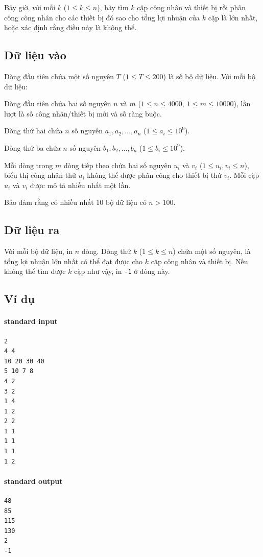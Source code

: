 \documentclass[11pt]{article}
\begin{document}
Bây giờ, với mỗi \(k\) (\(1\le k\le n\)), hãy tìm \(k\) cặp công nhân và
thiết bị rồi phân công công nhân cho các thiết bị đó sao cho tổng lợi nhuận
của \(k\) cặp là lớn nhất, hoặc xác định rằng điều này là không thể.

\subsection*{Dữ liệu vào}

Dòng đầu tiên chứa một số nguyên \(T\) (\(1\le T\le 200\)) là số bộ dữ liệu.
Với mỗi bộ dữ liệu:

Dòng đầu tiên chứa hai số nguyên \(n\) và \(m\)
(\(1\le n\le 4000,\ 1\le m\le 10000\)), lần lượt là số công nhân/thiết bị mới
và số ràng buộc.

Dòng thứ hai chứa \(n\) số nguyên \(a_1,a_2,\ldots,a_n\)
(\(1\le a_i\le 10^9\)).

Dòng thứ ba chứa \(n\) số nguyên \(b_1,b_2,\ldots,b_n\)
(\(1\le b_i\le 10^9\)).

Mỗi dòng trong \(m\) dòng tiếp theo chứa hai số nguyên \(u_i\) và \(v_i\)
(\(1\le u_i,v_i\le n\)), biểu thị công nhân thứ \(u_i\) không thể được phân
công cho thiết bị thứ \(v_i\). Mỗi cặp \(u_i\) và \(v_i\) được mô tả nhiều
nhất một lần.

Bảo đảm rằng có nhiều nhất \(10\) bộ dữ liệu có \(n>100\).

\subsection*{Dữ liệu ra}

Với mỗi bộ dữ liệu, in \(n\) dòng. Dòng thứ \(k\) (\(1\le k\le n\)) chứa một
số nguyên, là tổng lợi nhuận lớn nhất có thể đạt được cho \(k\) cặp công nhân
và thiết bị. Nếu không thể tìm được \(k\) cặp như vậy, in \texttt{-1} ở dòng
này.

\subsection*{Ví dụ}

\paragraph{standard input}
\begin{verbatim}
2
4 4
10 20 30 40
5 10 7 8
4 2
3 2
1 4
1 2
2 2
1 1
1 1
1 1
1 2
\end{verbatim}

\paragraph{standard output}
\begin{verbatim}
48
85
115
130
2
-1
\end{verbatim}
\end{document}
